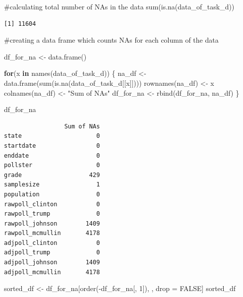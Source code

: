 \documentclass[
  letterpaper,
  DIV=11,
  numbers=noendperiod]{scrartcl}
\newenvironment{Shaded}{\begin{snugshade}}{\end{snugshade}}
\newcommand{\CommentTok}[1]{\textcolor[rgb]{0.37,0.37,0.37}{#1}}
\newcommand{\ConstantTok}[1]{\textcolor[rgb]{0.56,0.35,0.01}{#1}}
\newcommand{\ControlFlowTok}[1]{\textcolor[rgb]{0.00,0.23,0.31}{\textbf{#1}}}
\newcommand{\DecValTok}[1]{\textcolor[rgb]{0.68,0.00,0.00}{#1}}
\newcommand{\FunctionTok}[1]{\textcolor[rgb]{0.28,0.35,0.67}{#1}}
\newcommand{\NormalTok}[1]{\textcolor[rgb]{0.00,0.23,0.31}{#1}}
\newcommand{\OtherTok}[1]{\textcolor[rgb]{0.00,0.23,0.31}{#1}}
\newcommand{\SpecialCharTok}[1]{\textcolor[rgb]{0.37,0.37,0.37}{#1}}
\newcommand{\StringTok}[1]{\textcolor[rgb]{0.13,0.47,0.30}{#1}}
\begin{document}
\begin{Shaded}
\begin{Highlighting}[]
\CommentTok{\#calculating total number of NAs in the data }
\FunctionTok{sum}\NormalTok{(}\FunctionTok{is.na}\NormalTok{(data\_of\_task\_d))}
\end{Highlighting}
\end{Shaded}

\begin{verbatim}
[1] 11604
\end{verbatim}

\begin{Shaded}
\begin{Highlighting}[]
\CommentTok{\#creating a data frame which counts NAs for each column of the data}

\NormalTok{df\_for\_na }\OtherTok{\textless{}{-}} \FunctionTok{data.frame}\NormalTok{()}

\ControlFlowTok{for}\NormalTok{(x }\ControlFlowTok{in} \FunctionTok{names}\NormalTok{(data\_of\_task\_d)) \{}
\NormalTok{  na\_df }\OtherTok{\textless{}{-}} \FunctionTok{data.frame}\NormalTok{(}\FunctionTok{sum}\NormalTok{(}\FunctionTok{is.na}\NormalTok{(data\_of\_task\_d[[x]])))}
  \FunctionTok{rownames}\NormalTok{(na\_df) }\OtherTok{\textless{}{-}}\NormalTok{ x}
  \FunctionTok{colnames}\NormalTok{(na\_df) }\OtherTok{\textless{}{-}} \StringTok{"Sum of NAs"}
\NormalTok{  df\_for\_na }\OtherTok{\textless{}{-}} \FunctionTok{rbind}\NormalTok{(df\_for\_na, na\_df)}
\NormalTok{\}}

\NormalTok{df\_for\_na}
\end{Highlighting}
\end{Shaded}

\begin{verbatim}
                 Sum of NAs
state                     0
startdate                 0
enddate                   0
pollster                  0
grade                   429
samplesize                1
population                0
rawpoll_clinton           0
rawpoll_trump             0
rawpoll_johnson        1409
rawpoll_mcmullin       4178
adjpoll_clinton           0
adjpoll_trump             0
adjpoll_johnson        1409
adjpoll_mcmullin       4178
\end{verbatim}

\begin{Shaded}
\begin{Highlighting}[]
\NormalTok{sorted\_df }\OtherTok{\textless{}{-}}\NormalTok{ df\_for\_na[}\FunctionTok{order}\NormalTok{(}\SpecialCharTok{{-}}\NormalTok{df\_for\_na[, }\DecValTok{1}\NormalTok{]), , drop }\OtherTok{=} \ConstantTok{FALSE}\NormalTok{]}
\NormalTok{sorted\_df}
\end{Highlighting}
\end{Shaded}
\end{document}
